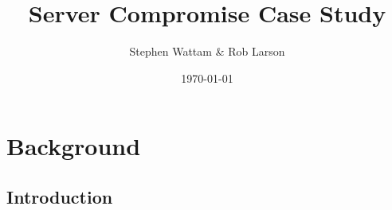 \documentclass[xcolor=x11names,compress]{beamer}
\title{Server Compromise Case Study}
\author{Stephen Wattam \& Rob Larson}
\institute[2013]{Lancaster University}
\date{\tiny \today}
\begin{document}
\maketitle

\section[Outline]{}
\frame{\tableofcontents}




\section{Background}

\subsection{Introduction}
\end{document}
